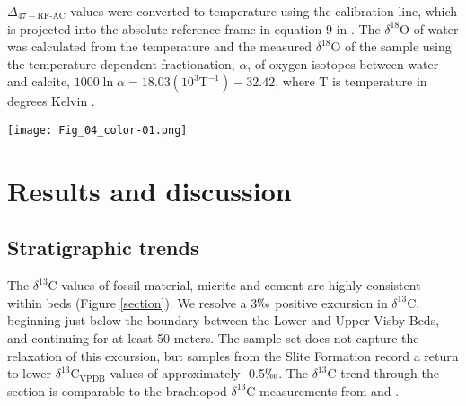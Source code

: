 \documentclass[5p, authoryear]{elsarticle}
\begin{document}
$\Delta_{47-\text{RF-AC}}$ values were converted to temperature using the \cite{Ghosh2006} calibration line, which is projected into the absolute reference frame in equation 9 in \cite{Dennis2011}. The $\delta^{18}$O of water was calculated from the temperature and the measured $\delta^{18}$O of the sample using the temperature-dependent fractionation, $\alpha$, of oxygen isotopes between water and calcite, $1000\ln\alpha=18.03(10^3\text{T}^{-1})-32.42$, where T is temperature in degrees Kelvin \citep{Kim1997}. 

\begin{figure*}[t]
\centering
\texttt{[image: Fig\_04\_color-01.png]}
\caption{The $\delta^{13}$C, $\delta^{18}$O and clumped isotope temperature of all the samples analyzed in this study, plotted against stratigraphic height. For the Lower \& Upper Visby and H\"{o}gklint Formations, a height of zero meters is defined by the contact between the Lower Visby Beds and the Upper Visby Beds. For the Slite Formation, a height of zero meters is defined as an arbitrary bed near the base of the outcrop. Brachiopod $\delta^{13}$C and $\delta^{18}$O measurements from \cite{Munnecke2003} are also included. Error bars represent the standard error of the mean.}
\label{section}
\end{figure*}

\section{Results and discussion}

\subsection{Stratigraphic trends}

The $\delta^{13}$C values of fossil material, micrite and cement are highly consistent within beds (Figure \ref{section}). We resolve a 3$\permil$ positive excursion in $\delta^{13}$C, beginning just below the boundary between the Lower and Upper Visby Beds, and continuing for at least 50 meters. The sample set does not capture the relaxation of this excursion, but samples from the Slite Formation record a return to lower $\delta^{13}$C$_{\text{VPDB}}$ values of approximately -0.5$\permil$. The $\delta^{13}$C trend through the section is comparable to the brachiopod $\delta^{13}$C measurements from \cite{Bickert1997} and \cite{Munnecke2003}. 
\end{document}
